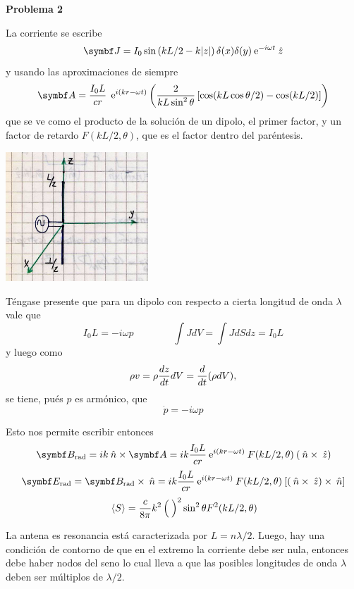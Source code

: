 \documentclass[10pt,oneside]{CBFT_book}
\begin{document}
\begin{ejemplo}{\bf Problema 2}

La corriente se escribe
\[
	\vb J = I_0 \sin\left( kL /2 - k|z| \right)\delta(x) \delta(y)\euler^{-i \omega t} \zver
\]
y usando las aproximaciones de siempre
\[
	\vb{A} = \frac{ I_0 L }{ c r } \: \euler^{i(kr-\omega t)} 
	\left( \frac{ 2 }{ k L\sin^2\theta } \left[ \cos(kL\cos\theta/2) - \cos(kL/2) \right] \right)
\]
que se ve como el producto de la solución de un dipolo, el primer factor, y un factor de retardo
$F(kL/2,\theta)$, que es el factor dentro del paréntesis.

\includegraphics[width=0.4\textwidth]{images/fig_ft1_antena_prob2.jpg}

Téngase presente que para un dipolo con respecto a cierta longitud de onda $\lambda$ vale que
\[
	I_0L = - i \omega p \qquad \qquad \int JdV = \int J dS dz = I_0 L
\]
y luego como 
\[
	\rho v = \rho \frac{d^{\hspace{-0.05em}} {z}}{d {t}^{\hspace{-0.05em}}}dV = \frac{d^{\hspace{-0.05em}} {}}{d {t}^{\hspace{-0.05em}}}(\rho dV), 
\]
se tiene, pués $p$ es armónico, que
\[
	\dot{p} = - i \omega p
\]

Esto nos permite escribir entonces
\[
	\vb B_{\text{rad}} = i k \nver \times \vb A =
	i k \frac{I_0L}{cr} \euler^{i(kr-\omega t)} \: F(kL/2,\theta) \: (\nver\times\zver)
\]
\[
	\vb E_{\text{rad}} = \vb B_{\text{rad}} \times \nver =
	i k \frac{I_0L}{cr} \euler^{i(kr-\omega t)} \: F(kL/2,\theta) \: [(\nver\times\zver)\times \nver]
\]
\[
	\:\left\langle S \right\rangle = \frac{c}{8\pi} k^2 \left( \frac{  }{  } \right)^2 \sin^2\theta F^2(kL/2,\theta)
\]

La antena es resonancia está caracterizada por $L = n\lambda/2$.
Luego, hay una condición de contorno de que en el extremo la corriente debe ser nula,
entonces debe haber nodos del seno lo cual lleva a que las posibles longitudes de
onda $\lambda$ deben ser múltiplos de $\lambda/2$.



\end{ejemplo}






\end{document}
